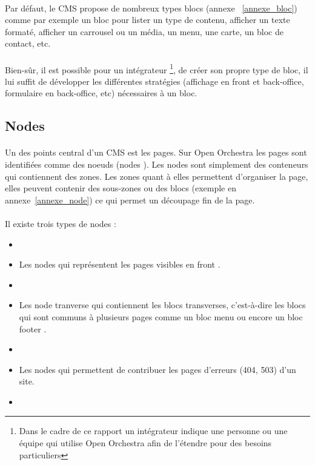 	      	\paragraph{}
	      	Par défaut, le CMS propose de nombreux types blocs (annexe ~\ref{annexe_bloc}) comme par exemple un bloc pour lister un type de contenu, afficher un texte formaté, afficher un carrousel ou un média, un menu, une carte, un bloc de contact, etc.
	      \paragraph{}
	      	 Bien-sûr, il est possible pour un intégrateur \footnote{Dans le cadre de ce rapport un intégrateur indique une personne ou une équipe qui utilise Open Orchestra afin de  l'étendre pour des besoins particuliers}, de créer son propre type de bloc, il lui suffit de développer les différentes stratégies (affichage en front et back-office, formulaire en back-office, etc) nécessaires à un bloc.  
         \subsection{Nodes}
         \paragraph{}
         Un des points central d'un CMS est les pages. Sur Open Orchestra les pages sont identifiées comme des noeuds (\og nodes \fg{}).
          Les nodes sont simplement des conteneurs qui contiennent des zones. Les zones quant à elles permettent d'organiser la page, elles peuvent contenir des sous-zones ou des blocs (exemple en annexe~\ref{annexe_node}) ce qui permet un découpage fin de la page. 
         \paragraph{}
         Il existe trois types de nodes : 
         \begin{itemize}
         \item[]
         \item  Les nodes qui représentent les pages visibles en \og front \fg{}.
          \item[]
         \item  Les \og node tranverse \fg{} qui contiennent les blocs transverses, c'est-à-dire les blocs qui sont communs à plusieurs pages comme un bloc \og menu \fg{} ou encore un bloc \og footer \fg{}.
          \item[]
         \item Les nodes qui permettent de contribuer les pages d'erreurs (404, 503) d'un site.
         \item[]
         \end{itemize}
